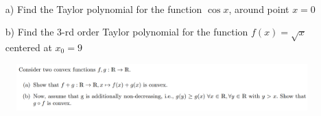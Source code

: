 \begin{problem}
    \\
    \begin{enumerate}
        \item[a) ] Find the Taylor polynomial for the function $\cos{x}$, around point $x=0$
        \item[b) ]  Find the 3-rd order Taylor polynomial for the function $f(x) = \sqrt{x}$ centered at $x_0 = 9$
    \end{enumerate}
\end{problem}

\begin{figure}
    \centering
    \includegraphics[width=1\linewidth]{figs/convexity.png}
\end{figure}